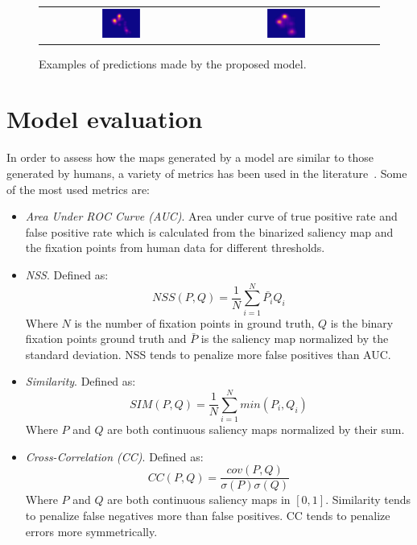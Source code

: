 \documentclass[10pt,twocolumn,letterpaper]{article}
\begin{document}
\begin{figure}
\begin{center}
\begin{tabular} {ccc}
    \includegraphics[width=0.25\textwidth]{./img/sign_gt.jpg} &
    \includegraphics[width=0.25\textwidth]{./img/sign_m.jpg}\\
    \end{tabular}
\end{center}
    \caption{Examples of predictions made by the proposed model.}
    \label{fig:preds}
\end{figure}

\section{Model evaluation}
\label{sec:metrics}
In order to assess how the maps generated by a model are similar to those
generated by humans, a variety of metrics has been used in the
literature~\cite{judd_2016}.
Some of the most used metrics are:
\begin{itemize}
    \item \emph{Area Under ROC Curve (AUC)}.
    Area under curve of true positive rate and false positive rate which is
    calculated from the binarized saliency map and the fixation points
    from human data for different thresholds.

    \item \emph{NSS}.
    Defined as:
	$$NSS(P, Q) = \frac{1}{N}\sum\limits_{i=1}^N{\bar{P_{i}}Q_{i}}$$
    Where $N$ is the number of fixation points in ground truth,
    $Q$ is the binary fixation points ground truth and $\bar{P}$ is the
    saliency map normalized by the standard deviation.
    NSS tends to penalize more false positives than AUC.

    \item \emph{Similarity}.
    Defined as:
	$$SIM(P, Q) = \frac{1}{N}\sum\limits_{i=1}^N{min(P_i, Q_i)}$$
    Where $P$ and $Q$ are both continuous saliency maps normalized
    by their sum.

    \item \emph{Cross-Correlation (CC)}.
    Defined as:
	$$CC(P, Q) = \frac{cov(P,Q)}{\sigma(P)\sigma(Q)}$$
    Where $P$ and $Q$ are both continuous saliency maps in $[0, 1]$.
    Similarity tends to penalize false negatives more than false positives.
    CC tends to penalize errors more symmetrically.
\end{itemize}
\end{document}
